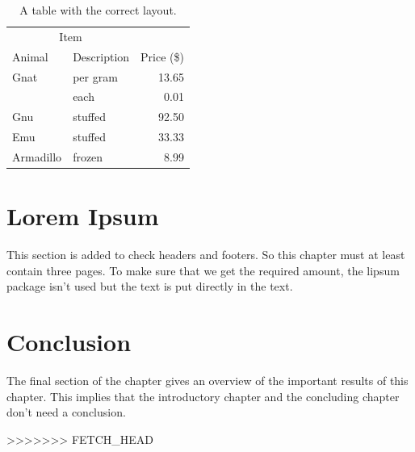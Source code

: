 \begin{table}
  \centering
  \begin{tabular}{@{}llr@{}} \toprule
    \multicolumn{2}{c}{Item} \\ \cmidrule(r){1-2}
    Animal    & Description & Price (\$)\\ \midrule
    Gnat      & per gram    & 13.65 \\
              & each        & 0.01 \\
    Gnu       & stuffed     & 92.50 \\
    Emu       & stuffed     & 33.33 \\
    Armadillo & frozen      & 8.99 \\ \bottomrule
  \end{tabular}
  \caption{A table with the correct layout.}
  \label{tab:ok}
\end{table}

\section{Lorem Ipsum}
This section is added to check headers and footers. So this chapter must at
least contain three pages. To make sure that we get the required amount,
the \textsf{lipsum} package isn't used but the text is put directly in the
text.


\section{Conclusion}
The final section of the chapter gives an overview of the important results
of this chapter. This implies that the introductory chapter and the
concluding chapter don't need a conclusion.

>>>>>>> FETCH_HEAD

